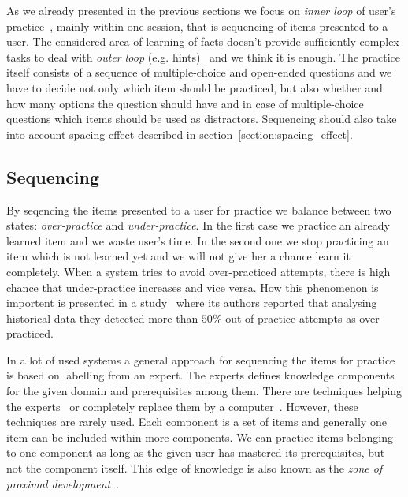\documentclass[table,color]{fithesis3/fithesis3}
\begin{document}
As we already presented in the previous sections we focus on \emph{inner loop}
of user's practice~\cite{koedinger2013new}, mainly within one session, that
is sequencing of items presented to a user. The considered area of learning
of facts doesn't provide sufficiently complex tasks to deal with \emph{outer
loop} (e.g. hints)~\cite{koedinger2013new} and we think it is enough. The
practice itself consists of a sequence of multiple-choice and open-ended
questions and we have to decide not only which item should be practiced, but
also whether and how many options the question should have and in case of
multiple-choice questions which items should be used as distractors. Sequencing
should also take into account spacing effect described in
section~\ref{section:spacing_effect}.

\subsection{Sequencing}

By seqencing the items presented to a user for practice we balance between two
states: \emph{over-practice} and \emph{under-practice}. In the first case we
practice an already learned item and we waste user's time. In the second one we
stop practicing an item which is not learned yet and we will not give her a
chance learn it completely. When a system tries to avoid over-practiced
attempts, there is high chance that under-practice increases and vice versa.
How this phenomenon is importent is presented in a study~\cite{cen2007over}
where its authors reported that analysing historical data they detected more
than $50\%$ out of practice attempts as over-practiced.

In a lot of used systems a general approach for sequencing the items for
practice is based on labelling from an expert. The experts defines knowledge
components for the given domain and prerequisites among them. There are
techniques helping the ex\-perts~\cite{niznan2014using} or completely replace
them by a computer~\cite{boros2013automatic}. However, these techniques are
rarely used. Each component is a set of items and generally one item can be
included within more components. We can practice items belonging to one
component as long as the given user has mastered its prerequisites, but not the
component itself. This edge of knowledge is also known as the \emph{zone of
proximal development}~\cite{lee2005signifying}.
\end{document}
